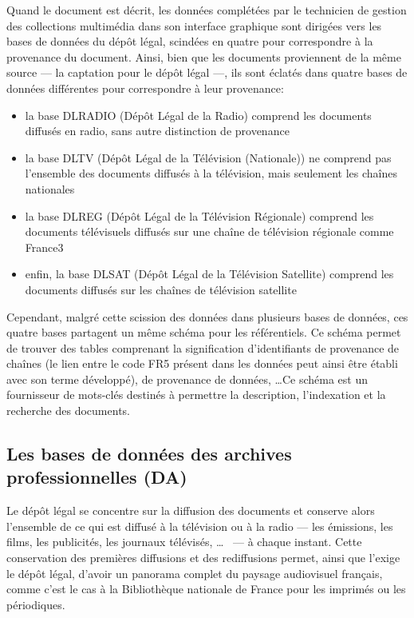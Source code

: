 Quand le document est décrit, les données complétées par le technicien de gestion des collections multimédia dans son interface graphique sont dirigées vers les bases de données du dépôt légal, scindées en quatre pour correspondre à la provenance du document. Ainsi, bien que les documents proviennent de la même source --- la captation pour le dépôt légal ---, ils sont éclatés dans quatre bases de données différentes pour correspondre à leur provenance:
\begin{itemize}
	\item la base DLRADIO (Dépôt Légal de la Radio) comprend les documents diffusés en radio, sans autre distinction de provenance
	\item la base DLTV (Dépôt Légal de la Télévision (Nationale)) ne comprend pas l'ensemble des documents diffusés à la télévision, mais seulement les chaînes nationales
	\item la base DLREG (Dépôt Légal de la Télévision Régionale) comprend les documents télévisuels diffusés sur une chaîne de télévision régionale comme France3
	\item enfin, la base DLSAT (Dépôt Légal de la Télévision Satellite) comprend les documents diffusés sur les chaînes de télévision satellite
\end{itemize}
\bigskip

Cependant, malgré cette scission des données dans plusieurs bases de données, ces quatre bases partagent un même schéma pour les référentiels. Ce schéma permet de trouver des tables comprenant la signification d'identifiants de provenance de chaînes (le lien entre le code \og FR5\fg{} présent dans les données peut ainsi être établi avec son terme développé), de provenance de données, \dots Ce schéma est un fournisseur de mots-clés destinés à permettre la description, l'indexation et la recherche des documents.

\subsection{\label{I-B-2-b}Les bases de données des archives professionnelles (DA)}

Le dépôt légal se concentre sur la diffusion des documents et conserve alors l'ensemble de ce qui est diffusé à la télévision ou à la radio --- les émissions, les films, les publicités, les journaux télévisés, \dots~ --- à chaque instant. Cette conservation des premières diffusions et des rediffusions permet, ainsi que l'exige le dépôt légal, d'avoir un panorama complet du paysage audiovisuel français, comme c'est le cas à la Bibliothèque nationale de France pour les imprimés ou les périodiques.\\

